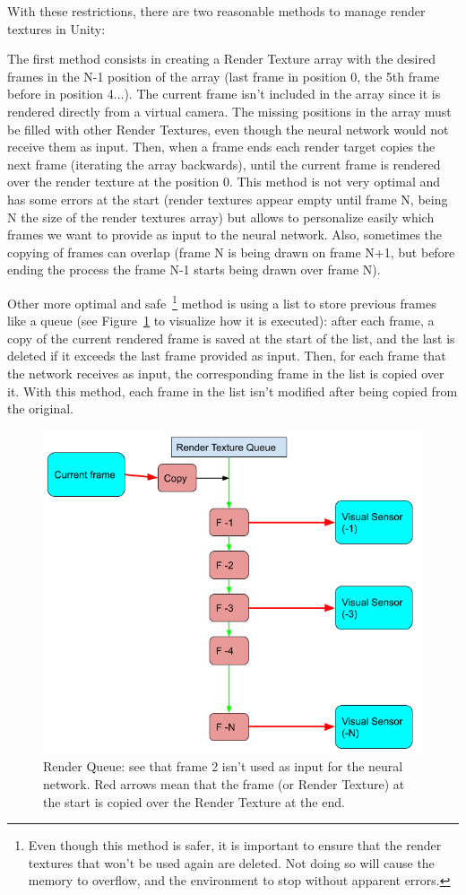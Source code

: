 With these restrictions, there are two reasonable methods to manage render textures in Unity:

The first method consists in creating a Render Texture array with the desired frames in the N-1 position of the array (last frame in position 0, the 5th frame before in position 4...). The current frame isn't included in the array since it is rendered directly from a virtual camera. The missing positions in the array must be filled with other Render Textures, even though the neural network would not receive them as input. Then, when a frame ends each render target copies the next frame (iterating the array backwards), until the current frame is rendered over the render texture at the position 0.
This method is not very optimal and has some errors at the start (render textures appear empty until frame N, being N the size of the render textures array) but allows to personalize easily which frames we want to provide as input to the neural network. Also, sometimes the copying of frames can overlap (frame N is being drawn on frame N+1, but before ending the process the frame N-1 starts being drawn over frame N).

Other more optimal and safe~\footnote{Even though this method is safer, it is important to ensure that the render textures that won't be used again are deleted. Not doing so will cause the memory to overflow, and the environment to stop without apparent errors.} method is using a list to store previous frames like a queue (see Figure~\ref{fig:renderqueue} to visualize how it is executed): after each frame, a copy of the current rendered frame is saved at the start of the list, and the last is deleted if it exceeds the last frame provided as input. Then, for each frame that the network receives as input, the corresponding frame in the list is copied over it. With this method, each frame in the list isn't modified after being copied from the original.

\begin{figure}[h]
  \centering
		\includegraphics[width=.9\textwidth]{img/renderqueue.png}
  \caption{Render Queue: see that frame 2 isn't used as input for the neural network. Red arrows mean that the frame (or Render Texture) at the start is copied over the Render Texture at the end.}
  \label{fig:renderqueue}
\end{figure}

